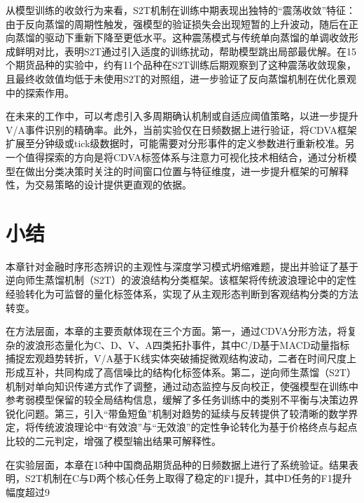 从模型训练的收敛行为来看，S2T机制在训练中期表现出独特的``震荡收敛''特征：由于反向蒸馏的周期性触发，强模型的验证损失会出现短暂的上升波动，随后在正向蒸馏的驱动下重新下降至更低水平。这种震荡模式与传统单向蒸馏的单调收敛形成鲜明对比，表明S2T通过引入适度的训练扰动，帮助模型跳出局部最优解。在15个期货品种的实验中，约有11个品种在S2T训练后期观察到了这种震荡收敛现象，且最终收敛值均低于未使用S2T的对照组，进一步验证了反向蒸馏机制在优化景观中的探索作用。

在未来的工作中，可以考虑引入多周期确认机制或自适应阈值策略，以进一步提升V/A事件识别的精确率。此外，当前实验仅在日频数据上进行验证，将CDVA框架扩展至分钟级或tick级数据时，可能需要对分形事件的定义参数进行重新校准。另一个值得探索的方向是将CDVA标签体系与注意力可视化技术相结合，通过分析模型在做出分类决策时关注的时间窗口位置与特征维度，进一步提升框架的可解释性，为交易策略的设计提供更直观的依据。

\section{小结}

本章针对金融时序形态辨识的主观性与深度学习模式坍缩难题，提出并验证了基于逆向师生蒸馏机制（S2T）的波浪结构分类框架。该框架将传统波浪理论中的定性经验转化为可监督的量化标签体系，实现了从主观形态判断到客观结构分类的方法转变。

在方法层面，本章的主要贡献体现在三个方面。第一，通过CDVA分形方法，将复杂的波浪形态量化为C、D、V、A四类拓扑事件，其中C/D基于MACD动量指标捕捉宏观趋势转折，V/A基于K线实体突破捕捉微观结构波动，二者在时间尺度上形成互补，共同构成了高信噪比的结构化标签体系。第二，逆向师生蒸馏（S2T）机制对单向知识传递方式作了调整，通过动态监控与反向校正，使强模型在训练中参考弱模型保留的较全局结构信息，缓解了多任务训练中的类别不平衡与决策边界锐化问题。第三，引入``带鱼短鱼''机制对趋势的延续与反转提供了较清晰的数学界定，将传统波浪理论中``有效浪''与``无效浪''的定性争论转化为基于价格终点与起点比较的二元判定，增强了模型输出结果可解释性。

在实验层面，本章在15种中国商品期货品种的日频数据上进行了系统验证。结果表明，S2T机制在C与D两个核心任务上取得了稳定的F1提升，其中D任务的F1提升幅度超过9%

